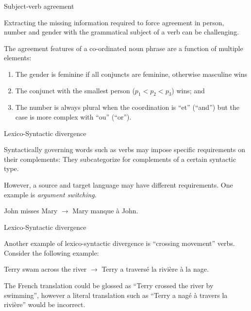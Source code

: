 \documentclass{beamer}
\begin{document}
\begin{frame}{Subject-verb agreement}

  Extracting the missing information required to force agreement in person, number and gender with the grammatical subject of a verb can be challenging.

  \medskip

  The agreement features of a co-ordinated noun phrase are a function of multiple elements:

  \begin{enumerate}
    \item The gender is feminine if all conjuncts are feminine, otherwise masculine wins
    \item The conjunct with the smallest person ($p_1<p_2<p_3$) wins; and
    \item The number is always plural when the coordination is ``et'' (``and'') but the case is more complex with ``ou'' (``or'').
  \end{enumerate}

\end{frame}

\begin{frame}{Lexico-Syntactic divergence}

  Syntactically governing words such as verbs may impose specific requirements on their complements: They subcategorize for complements of a certain syntactic type.

  \medskip

  However, a source and target language may have different requirements. One example is \textit{argument switching}.

  \medskip

  John misses Mary $\rightarrow$ Mary manque \`a John.

\end{frame}

\begin{frame}{Lexico-Syntactic divergence}

  Another example of lexico-syntactic divergence is ``crossing movement'' verbs. Consider the following example:

  \medskip

  Terry swam across the river $\rightarrow$ Terry a travers\'e la rivi\`ere \`a la nage.

  \medskip

  The French translation could be glossed as ``Terry crossed the river by swimming'', however a literal translation such as ``Terry a nag\'e \`a travers la rivi\`ere'' would be incorrect.

\end{frame}
\end{document}
